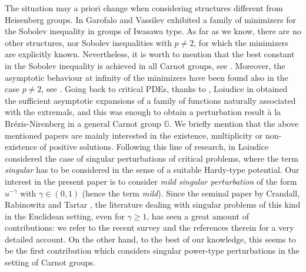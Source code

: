 \documentclass[11pt]{amsart}
\numberwithin{equation}{section} %
\theoremstyle{definition}
\begin{document}
The situation may a priori change when considering structures different from Heisenberg groups. In \cite{GaroVa2, GaroVa} Garofalo and Vassilev exhibited a family of minimizers for the Sobolev inequality in groups of Iwasawa type. As far as we know, there are no other structures, nor Sobolev inequalities with $p\neq 2$, for which the minimizers are explicitly known. Nevertheless, it is worth to mention that the best constant in the Sobolev inequality is achieved in all Carnot groups, see \cite{GaroVa2}. Moreover, the asymptotic behaviour at infinity of the minimizers have been found also in the case $p\neq 2$, see \cite{Loiudice3}. Going back to critical PDEs, thanks to \cite{BoUg}, Loiudice in \cite{Loiudice1} obtained the sufficient asymptotic expansions of a family of functions naturally associated with the extremals, and this was enough to obtain a perturbation result à la Br\'{e}zis-Nirenberg in a general Carnot group $\mathbb{G}$. We briefly mention that the above mentioned papers are mainly interested in the existence, multiplicity or non-existence of positive solutions. Following this line of research, in \cite{Loiudice2, Loiudice4} Loiudice considered the case of singular perturbations of critical problems, where the term {\em singular} has to be considered in the sense of a suitable Hardy-type potential. Our interest in the present paper is to consider {\em mild singular perturbation} of the form $u^{-\gamma}$ with $\gamma \in (0,1)$ (hence the term {\em mild}). Since the seminal paper by Crandall, Rabinowitz and Tartar \cite{CRT}, the literature dealing with singular problems of this kind in the Euclidean setting, even for $\gamma \geq 1$, has seen a great amount of contributions: we refer to the recent survey \cite{OP3} and the references therein for a very detailed account. On the other hand, to the best of our knowledge, this seems to be the first contribution which considers singular power-type perturbations in the setting of Carnot groups.
\end{document}
